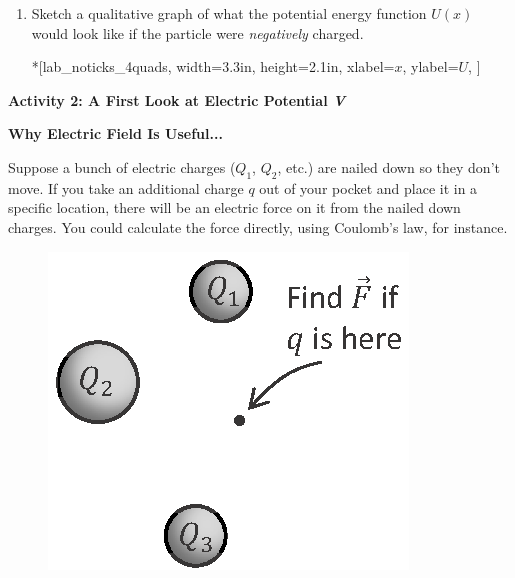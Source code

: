 \begin{enumerate}[labparts]
\item Sketch a qualitative graph of what the potential energy function $U(x)$ would look like if the particle were \textit{negatively} charged.

\begin{lab_axis}*[lab_noticks_4quads,
	width={3.3in}, height={2.1in},
	xlabel={$x$},
	ylabel={$U$},
	]
\end{lab_axis}

\end{enumerate}

\pagebreak[3]
\textbf{Activity 2: A First Look at Electric Potential \textit{V}}

\textbf{Why Electric Field Is Useful...}


Suppose a bunch of electric charges ($Q_1$, $Q_2$, etc.) are nailed down so they don't move.  If you take an additional charge $q$ out of your pocket and place it in a specific location, there will be an electric force on it from the nailed down charges.  You could calculate the force directly, using Coulomb's law, for instance.  
\begin{figure}
\begin{center}
\vspace{-0.3 in}
\includegraphics[scale=0.8]{potential_intro/activity_3_figs/charge_from_pocket.eps}
\end{center}
\end{figure}


